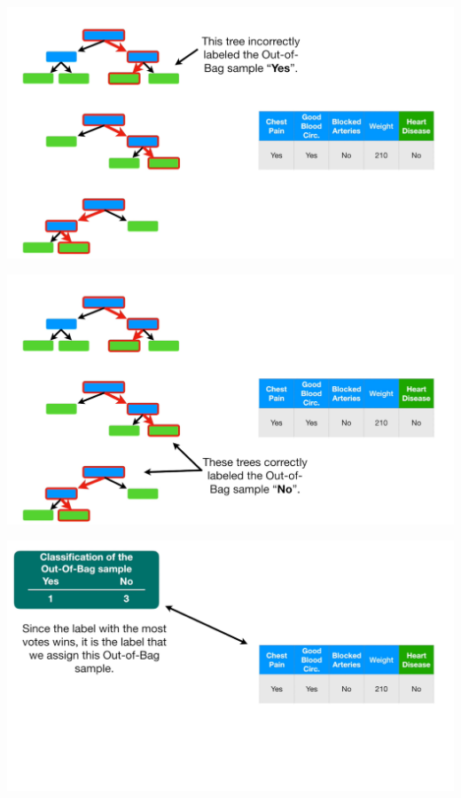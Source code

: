 \documentclass[
  ignorenonframetext,
]{beamer}
\begin{document}
\begin{frame}{}
\protect\hypertarget{section-77}{}
\includegraphics{images/r78.png}
\end{frame}

\begin{frame}{}
\protect\hypertarget{section-78}{}
\includegraphics{images/r79.png}
\end{frame}

\begin{frame}{}
\protect\hypertarget{section-79}{}
\includegraphics{images/r80.png}
\end{frame}
\end{document}
